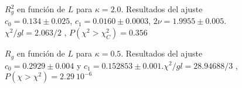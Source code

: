 \begin{figure}[h]
  \centering
  
  \caption{$R^2_g$ en función de $L$ para $\kappa=2.0$. Resultados del ajuste
    $c_0=0.134\pm 0.025$, $c_1=0.0160\pm 0.0003$, $2\nu=1.9955 \pm
    0.005$. $\chi^2/gl=2.063/2$ , $P(\chi^2>\chi_C^2)=0.356$}\label{Rg2_plana}







\end{figure}



\begin{figure}[h]
  \centering
  
   \caption{$R_g$ en función de $L$ para $\kappa=0.5$. Resultados del ajuste
     $c_0=0.2929 \pm 0.004$ y $c_1=0.152853\pm 0.001$.$\chi^2/gl=28.94688/3$ ,
     $P(\chi>\chi^2)=2.29\ 10^{-6}$}\label{rg2_rugosa}







\end{figure}

